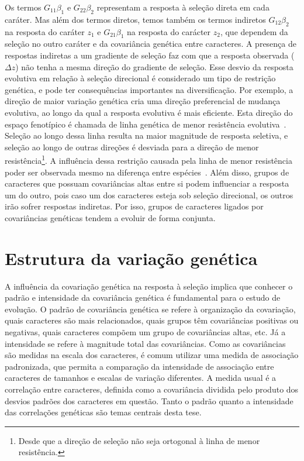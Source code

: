 \begin{refsection}
Os termos $G_{11}\beta_{1}$ e $G_{22}\beta_{2}$ representam a resposta à
seleção direta em cada caráter. Mas além dos termos diretos, temos também  os
termos indiretos $G_{12}\beta_{2}$ na resposta do caráter $z_1$ e
$G_{21}\beta_{1}$ na resposta do carácter $z_2$, que dependem da seleção no
outro caráter e da covariância genética entre caracteres. A presença de
respostas indiretas a um gradiente de seleção faz com que a resposta observada
($\Delta z$) não tenha a mesma direção do gradiente de seleção. Esse desvio da
resposta evolutiva em relação à seleção direcional é considerado um tipo de
restrição genética, e pode ter consequências importantes na diversificação.
Por exemplo, a direção de maior variação genética cria uma direção
preferencial de mudança evolutiva, ao longo da qual a resposta evolutiva é
mais eficiente. Esta direção do espaço fenotípico é chamada de linha genética
de menor resistência evolutiva~\parencite{Schluter1996-gw}. Seleção ao longo
dessa linha resulta na maior magnitude de resposta seletiva, e seleção ao
longo de outras direções é desviada para a direção de menor
resistência\footnote{Desde que a direção de seleção não seja ortogonal à linha
de menor resistência.}. A influência dessa restrição causada pela linha de
menor resistência poder ser observada mesmo na diferença entre
espécies~\parencite{Marroig2005-ce}. Além disso, grupos de caracteres que
possuam covariâncias altas entre si podem influenciar a resposta um do outro,
pois caso um dos caracteres esteja sob seleção direcional, os outros
irão sofrer respostas indiretas. Por isso, grupos de caracteres ligados por
covariâncias genéticas tendem a evoluir de forma conjunta.

\section{Estrutura da variação genética}

A influência da covariação genética na resposta à seleção implica que conhecer
o padrão e intensidade da covariância genética é fundamental para o estudo de
evolução. O padrão de covariância genética se refere à organização da
covariação, quais caracteres são mais relacionados, quais grupos têm
covariâncias positivas ou negativas, quais caracteres compõem um grupo de
covariâncias altas, etc. Já a intensidade se refere à magnitude total das
covariâncias. Como as covariâncias são medidas na escala dos caracteres, é
comum utilizar uma medida de associação padronizada, que permita a comparação
da intensidade de associação entre caracteres de tamanhos e escalas de
variação diferentes. A medida usual é a correlação entre caracteres, definida
como a covariância dividida pelo produto dos desvios padrões dos caracteres em
questão. Tanto o padrão quanto a intensidade das correlações genéticas são temas
centrais desta tese.


\end{refsection}
